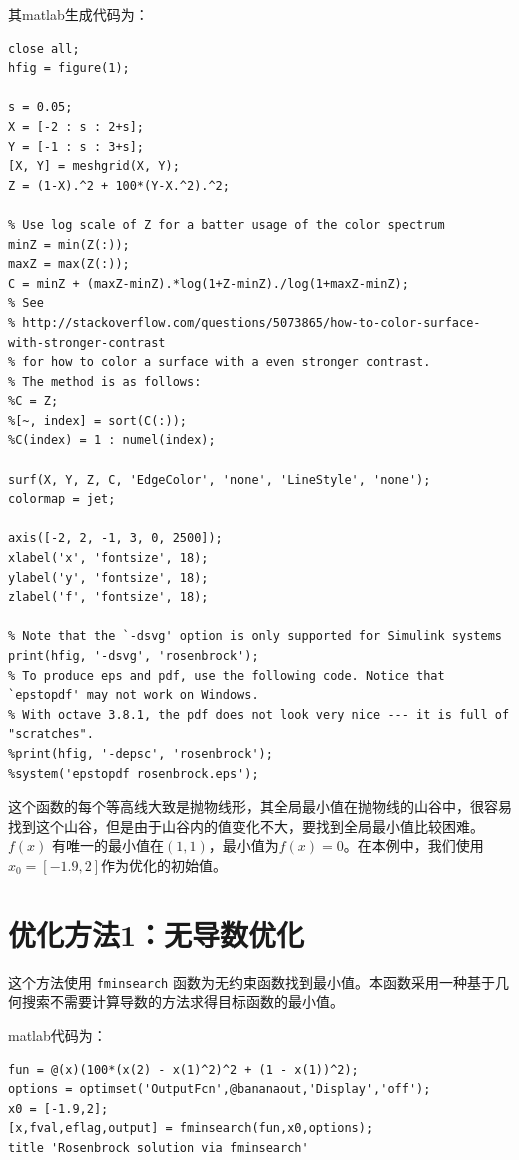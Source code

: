 \documentclass[10pt,a4paper,UTF8]{article}
\begin{document}
其matlab生成代码为：

\lstset{language=matlab,label= ,caption= ,captionpos=b,firstnumber=1,numbers=left}
\begin{lstlisting}
close all;
hfig = figure(1);

s = 0.05;
X = [-2 : s : 2+s];
Y = [-1 : s : 3+s];
[X, Y] = meshgrid(X, Y);
Z = (1-X).^2 + 100*(Y-X.^2).^2;

% Use log scale of Z for a batter usage of the color spectrum
minZ = min(Z(:));
maxZ = max(Z(:));
C = minZ + (maxZ-minZ).*log(1+Z-minZ)./log(1+maxZ-minZ);
% See
% http://stackoverflow.com/questions/5073865/how-to-color-surface-with-stronger-contrast
% for how to color a surface with a even stronger contrast.
% The method is as follows:
%C = Z;
%[~, index] = sort(C(:));
%C(index) = 1 : numel(index);

surf(X, Y, Z, C, 'EdgeColor', 'none', 'LineStyle', 'none');
colormap = jet;

axis([-2, 2, -1, 3, 0, 2500]);
xlabel('x', 'fontsize', 18);
ylabel('y', 'fontsize', 18);
zlabel('f', 'fontsize', 18);

% Note that the `-dsvg' option is only supported for Simulink systems
print(hfig, '-dsvg', 'rosenbrock');
% To produce eps and pdf, use the following code. Notice that `epstopdf' may not work on Windows.
% With octave 3.8.1, the pdf does not look very nice --- it is full of "scratches".
%print(hfig, '-depsc', 'rosenbrock');
%system('epstopdf rosenbrock.eps');
\end{lstlisting}



这个函数的每个等高线大致是抛物线形，其全局最小值在抛物线的山谷中，很容易找到这个山谷，但是由于山谷内的值变化不大，要找到全局最小值比较困难。 \(f(x)\) 有唯一的最小值在\((1,1)\)，最小值为\(f(x) = 0\)。在本例中，我们使用\(x_{0} = [-1.9,2]\)作为优化的初始值。
\section{优化方法1：无导数优化}
\label{sec:orgf4a6abb}


这个方法使用 \texttt{fminsearch} 函数为无约束函数找到最小值。本函数采用一种基于几何搜索不需要计算导数的方法求得目标函数的最小值。

matlab代码为：
\lstset{language=matlab,label= ,caption= ,captionpos=b,numbers=none}
\begin{lstlisting}
fun = @(x)(100*(x(2) - x(1)^2)^2 + (1 - x(1))^2);
options = optimset('OutputFcn',@bananaout,'Display','off');
x0 = [-1.9,2];
[x,fval,eflag,output] = fminsearch(fun,x0,options);
title 'Rosenbrock solution via fminsearch'
\end{lstlisting}
\end{document}
